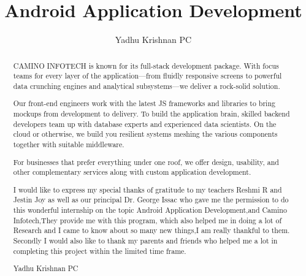 \documentclass{fisatproject}
\title{Android Application Development}
\author{Yadhu Krishnan PC}
\begin{document}
\maketitle
\makecert

\newpage
{}
\setcounter{page}{1}
\thispagestyle{plain}
\renewcommand\abstractname{ABSTRACT}
\begin{abstract}
\vspace{5cm}
CAMINO INFOTECH is known for its full-stack development package. With focus teams for every layer of the application—from fluidly responsive screens to powerful data crunching engines and analytical subsystems—we deliver a rock-solid solution.

Our front-end engineers work with the latest JS frameworks and libraries to bring mockups from development to delivery. To build the application brain, skilled backend developers team up with database experts and experienced data scientists. On the cloud or otherwise, we build you resilient systems meshing the various components together with suitable middleware.

For businesses that prefer everything under one roof, we offer design, usability, and other complementary services along with custom application development.
\end{abstract}




\newpage
\renewcommand\abstractname{ACKNOWLEDGMENT}
\thispagestyle{plain}
\begin{abstract}
\vspace{5cm}
 I would like to express my special thanks of gratitude to my teachers Reshmi R and Jestin Joy  as well as our principal Dr. George Issac who gave me the permission to do this wonderful internship on the topic Android Application Development,and  Camino Infotech,They provide me with this program, which also helped me in doing a lot of Research and I came to know about so many new things,I am really thankful to them.
Secondly I would also like to thank my parents and friends who helped me a lot in completing this project within the limited time frame.
\vspace{1cm}
\begin{flushright}
Yadhu Krishnan PC
\end{flushright}
\end{abstract}
\newpage

\restoregeometry
\tableofcontents
\newpage
\end{document}
